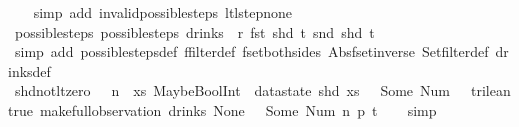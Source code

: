 \begin{isabellebody}
\ \ \isamarkupfalse%
\ {\isacharparenleft}simp\ add{\isacharcolon}\ invalid{\isacharunderscore}possible{\isacharunderscore}steps{\isacharunderscore}{}\ ltl{\isacharunderscore}step{\isacharunderscore}none{\isacharunderscore}{}{\isacharparenright}%
\endisatagproof
{\isafoldproof}%
%
\isadelimproof
\isanewline
%
\endisadelimproof
\isanewline
{}\isamarkupfalse%
\ possible{\isacharunderscore}steps{\isacharunderscore}{}{\isacharcolon}\ {\isachardoublequoteopen}possible{\isacharunderscore}steps\ drinks\ {}\ r\ {\isacharparenleft}fst\ {\isacharparenleft}shd\ t{\isacharparenright}{\isacharparenright}\ {\isacharparenleft}snd\ {\isacharparenleft}shd\ t{\isacharparenright}{\isacharparenright}\ {\isacharequal}\ {\isacharbraceleft}{\isacharbar}{\isacharbar}{\isacharbraceright}{\isachardoublequoteclose}\isanewline
%
\isadelimproof
\ \ %
\endisadelimproof
%
\isatagproof
{}\isamarkupfalse%
\ {\isacharparenleft}simp\ add{\isacharcolon}\ possible{\isacharunderscore}steps{\isacharunderscore}def\ ffilter{\isacharunderscore}def\ fset{\isacharunderscore}both{\isacharunderscore}sides\ Abs{\isacharunderscore}fset{\isacharunderscore}inverse\ Set{\isachardot}filter{\isacharunderscore}def\ drinks{\isacharunderscore}def{\isacharparenright}%
\endisatagproof
{\isafoldproof}%
%
\isadelimproof
\isanewline
%
\endisadelimproof
\isanewline
{}\isamarkupfalse%
\ shd{\isacharunderscore}not{\isacharunderscore}lt{\isacharunderscore}zero{\isacharcolon}\ {\isachardoublequoteopen}{}\ {\isasymle}\ n\ {\isasymLongrightarrow}\ {\isacharparenleft}{\isasymlambda}xs{\isachardot}\ MaybeBoolInt\ {\isacharparenleft}{\isacharless}{\isacharparenright}\ {\isacharparenleft}datastate\ {\isacharparenleft}shd\ xs{\isacharparenright}\ {\isachardollar}\ {}{\isacharparenright}\ {\isacharparenleft}Some\ {\isacharparenleft}Num\ {}{\isacharparenright}{\isacharparenright}\ {\isasymnoteq}\ trilean{\isachardot}true{\isacharparenright}\ {\isacharparenleft}make{\isacharunderscore}full{\isacharunderscore}observation\ drinks\ None\ {\isacharless}{}\ {\isachardollar}{\isacharcolon}{\isacharequal}\ Some\ {\isacharparenleft}Num\ n{\isacharparenright}{\isachargreater}\ p\ t{\isacharparenright}{\isachardoublequoteclose}\isanewline
%
\isadelimproof
\ \ %
\endisadelimproof
%
\isatagproof
{}\isamarkupfalse%
\ simp%
\endisatagproof
{\isafoldproof}%
%
\isadelimproof
\isanewline
%
\endisadelimproof
\isanewline
{}\isamarkupfalse%

\end{isabellebody}
